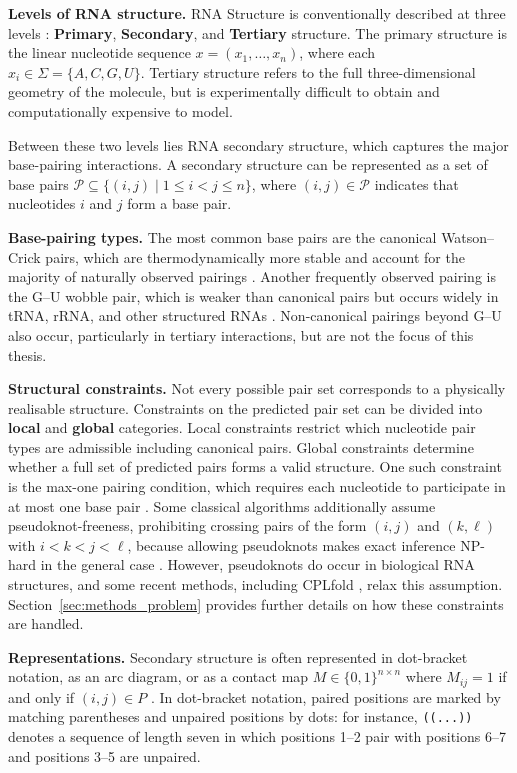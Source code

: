 \documentclass[logo,bsc,singlespacing,parskip]{infthesis}
\begin{document}
\textbf{Levels of RNA structure.} RNA Structure is conventionally described at three levels \citep{tinoco1999how,turner2009nndb}: \textbf{Primary}, \textbf{Secondary},
and \textbf{Tertiary} structure. The primary structure is the linear nucleotide sequence
$x = (x_1, \dots, x_n)$, where each $x_i \in \Sigma = \{A,C,G,U\}$. 
Tertiary structure refers to the full three-dimensional geometry of the molecule,
but is experimentally difficult to obtain and computationally expensive to model.

Between these two levels lies RNA secondary structure, which captures the
major base-pairing interactions. A secondary structure can be
represented as a set of base pairs $\mathcal{P} \subseteq \{(i,j) \mid 1 \le i < j \le n\}$, where $(i,j)\in\mathcal{P}$ indicates that nucleotides $i$ and $j$ form a
base pair.

\textbf{Base-pairing types.}
The most common base pairs are the canonical Watson--Crick pairs, which are thermodynamically more stable and account for the majority of naturally observed pairings \citep{sponer2005principles}. Another frequently observed pairing is the G--U wobble pair, which is weaker than canonical pairs but occurs widely in tRNA, rRNA, and other structured RNAs \citep{varani2000gu}. Non-canonical pairings beyond G--U also occur, particularly in tertiary interactions, but are not the focus of this thesis.
 
\textbf{Structural constraints.}
Not every possible pair set corresponds to a physically realisable structure. Constraints on the predicted pair set can be divided into \textbf{local} and \textbf{global} categories. Local constraints restrict which nucleotide pair types are admissible including canonical pairs. Global constraints determine whether a full set of predicted pairs forms a valid structure. One such constraint is the max-one pairing condition, which requires each nucleotide to participate in at most one base pair \citep{zuker1981optimal}. 
Some classical algorithms additionally assume pseudoknot-freeness, prohibiting crossing pairs of the form $(i,j)$ and $(k,\ell)$ with $i<k<j<\ell$, because
allowing pseudoknots makes exact inference NP-hard in the general case
\citep{LyngsoPedersen2000}. However, pseudoknots do occur in biological
RNA structures, and some recent methods, including CPLfold
\citep{wang2026cplfold}, relax this assumption.
Section~\ref{sec:methods_problem} provides further details on how these constraints are handled.

\textbf{Representations.}
Secondary structure is often represented in dot-bracket notation, 
as an arc diagram, or as a contact map $M\in\{0,1\}^{n\times n}$ 
where $M_{ij}=1$ if and only if $(i,j)\in P$ 
\citep{mathews2019benchmark}. In dot-bracket notation, paired 
positions are marked by matching parentheses and unpaired positions 
by dots: for instance, \texttt{((...))} denotes a sequence of 
length seven in which positions 1--2 pair with positions 6--7 and 
positions 3--5 are unpaired.
\end{document}
